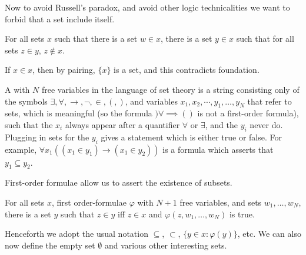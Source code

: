 Now to avoid Russell's paradox, and avoid other logic technicalities we want to forbid that a set include itself.
\begin{axiom}[foundation]
For all sets $x$ such that there is a set $w \in x$, there is a set $y \in x$ such that for all sets $z \in y$, $z \notin x$.
\end{axiom}
If $x \in x$, then by pairing, $\{x\}$ is a set, and this contradicts foundation.

A  with $N$ free variables in the language of set theory is a string consisting only of the symbols $\exists,\forall,\to,\neg,\in,(,)$, and variables $x_1,x_2,\cdots, y_1,\dots,y_N$ that refer to sets, which is meaningful (so the formula $)\forall \implies()$ is not a first-order formula), such that the $x_i$ always appear after a quantifier $\forall$ or $\exists$, and the $y_i$ never do.
Plugging in sets for the $y_i$ gives a statement which is either true or false.
For example, $\forall x_1((x_1 \in y_1) \to (x_1 \in y_2))$ is a formula which asserts that $y_1 \subseteq y_2$.

First-order formulae allow us to assert the existence of subsets.
\begin{axiom}
For all sets $x$, first order-formulae $\varphi$ with $N+1$ free variables, and sets $w_1, \dots, w_N$, there is a set $y$ such that $z \in y$ iff $z \in x$ and $\varphi(z, w_1, \dots, w_N)$ is true.
\end{axiom}
Henceforth we adopt the usual notation $\subseteq$, $\subset$, $\{y \in x: \varphi(y)\}$, etc.
We can also now define the empty set $\emptyset$ and various other interesting sets.

